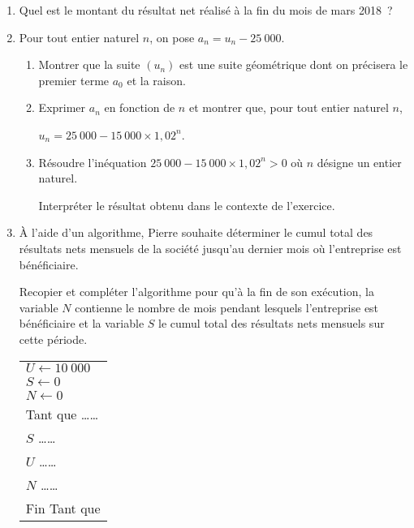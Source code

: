           \begin{enumerate}
               \item Quel est le montant du résultat net réalisé à la fin du mois de mars 2018~?
               \item Pour tout entier naturel $n$, on pose $a_n = u_n  - 25~000$.
               \begin{enumerate}[label=\alph*.]
                    \item Montrer que la suite $\left(u_n\right)$ est une suite géométrique dont on précisera le premier terme $a_0$ et la raison.
                    \item  Exprimer $a_n$ en fonction de $n$ et montrer que, pour tout entier naturel $n$,\:
                    \par
                    $u_n = 25~000 - 15~000 \times 1,02^n$.
                    \item  Résoudre l'inéquation $25~000 - 15~000 \times 1,02^n > 0$ où $n$ désigne un entier naturel.
                    \par
                    Interpréter le résultat obtenu dans le contexte de l'exercice.
               \end{enumerate}
               \item  À l'aide d'un algorithme, Pierre souhaite déterminer le cumul total des résultats nets mensuels de la société jusqu'au dernier mois où l'entreprise est bénéficiaire.
               \par
               Recopier et compléter l'algorithme pour qu'à la fin de son exécution, la variable $N$ contienne le nombre de mois pendant lesquels l'entreprise est bénéficiaire et la variable $S$ le cumul total des résultats nets mensuels sur cette période.
               \begin{center}
\begin{extern}%
                                   \begin{tabularx}{0.3\linewidth}{|X|}\hline
                         $U \gets 10~000$\\
                         $S \gets 0$\\
                         $N \gets 0$\\
                         Tant que \ldots\ldots\\
                         \hspace{1cm}$S$  \ldots\ldots\\
                         \hspace{1cm}$U$  \ldots\ldots\\
                         \hspace{1cm}$N$  \ldots\ldots\\
                         Fin Tant que\\ \hline
                    \end{tabularx}
               \end{extern}
                              \end{center}
          \end{enumerate}


